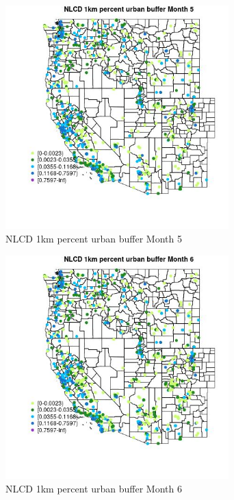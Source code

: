 \begin{figure} 
\centering  
\includegraphics[width=0.77\textwidth]{Code_Outputs/Report_ML_input_PM25_Step4_part_f_de_duplicated_aveswNAs_MapObsMo5NLCD_1km_percent_urban_buffer.jpg} 
\caption{\label{fig:Report_ML_input_PM25_Step4_part_f_de_duplicated_aveswNAsMapObsMo5NLCD_1km_percent_urban_buffer}NLCD 1km percent urban buffer Month 5} 
\end{figure} 
 

\begin{figure} 
\centering  
\includegraphics[width=0.77\textwidth]{Code_Outputs/Report_ML_input_PM25_Step4_part_f_de_duplicated_aveswNAs_MapObsMo6NLCD_1km_percent_urban_buffer.jpg} 
\caption{\label{fig:Report_ML_input_PM25_Step4_part_f_de_duplicated_aveswNAsMapObsMo6NLCD_1km_percent_urban_buffer}NLCD 1km percent urban buffer Month 6} 
\end{figure} 
 

